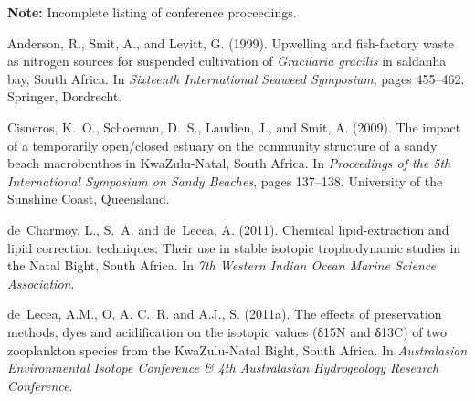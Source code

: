 


\nocite{*}


\textbf{Note:} Incomplete listing of conference proceedings.

\begin{thebibliography}{}

  Anderson, R., Smit, A., and Levitt, G. (1999).
  \newblock Upwelling and fish-factory waste as nitrogen sources for suspended
    cultivation of \emph{Gracilaria gracilis} in saldanha bay, {S}outh {A}frica.
  \newblock In {\em Sixteenth International Seaweed Symposium}, pages 455--462.
    Springer, Dordrecht.
  
  Cisneros, K.~O., Schoeman, D.~S., Laudien, J., and Smit, A. (2009).
  \newblock The impact of a temporarily open/closed estuary on the community
    structure of a sandy beach macrobenthos in {K}wa{Z}ulu-{N}atal, {S}outh
    {A}frica.
  \newblock In {\em Proceedings of the 5th International Symposium on Sandy
    Beaches}, pages 137--138. University of the Sunshine Coast, Queensland.
  
  de~Charmoy, L., S.~A. and de~Lecea, A. (2011).
  \newblock Chemical lipid-extraction and lipid correction techniques: Their use
    in stable isotopic trophodynamic studies in the {N}atal {B}ight, {S}outh
    {A}frica.
  \newblock In {\em 7th Western Indian Ocean Marine Science Association}.
  
  de~Lecea, A.M., O. A. C.~R. and A.J., S. (2011a).
  \newblock The effects of preservation methods, dyes and acidification on the
    isotopic values (δ15{N} and δ13{C}) of two zooplankton species from the
    {K}wa{Z}ulu-{N}atal {B}ight, {S}outh {A}frica.
  \newblock In {\em Australasian Environmental Isotope Conference \& 4th
    Australasian Hydrogeology Research Conference}.
  

\end{thebibliography}
